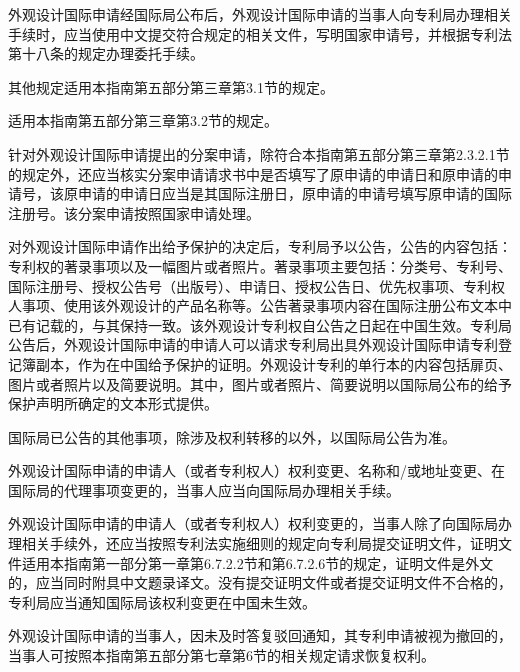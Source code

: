 外观设计国际申请经国际局公布后，外观设计国际申请的当事人向专利局办理相关手续时，应当使用中文提交符合规定的相关文件，写明国家申请号，并根据专利法第十八条的规定办理委托手续。

其他规定适用本指南第五部分第三章第3.1节的规定。

适用本指南第五部分第三章第3.2节的规定。

针对外观设计国际申请提出的分案申请，除符合本指南第五部分第三章第2.3.2.1节的规定外，还应当核实分案申请请求书中是否填写了原申请的申请日和原申请的申请号，该原申请的申请日应当是其国际注册日，原申请的申请号填写原申请的国际注册号。该分案申请按照国家申请处理。

对外观设计国际申请作出给予保护的决定后，专利局予以公告，公告的内容包括：专利权的著录事项以及一幅图片或者照片。著录事项主要包括：分类号、专利号、国际注册号、授权公告号（出版号）、申请日、授权公告日、优先权事项、专利权人事项、使用该外观设计的产品名称等。公告著录事项内容在国际注册公布文本中已有记载的，与其保持一致。该外观设计专利权自公告之日起在中国生效。专利局公告后，外观设计国际申请的申请人可以请求专利局出具外观设计国际申请专利登记簿副本，作为在中国给予保护的证明。外观设计专利的单行本的内容包括扉页、图片或者照片以及简要说明。其中，图片或者照片、简要说明以国际局公布的给予保护声明所确定的文本形式提供。

国际局已公告的其他事项，除涉及权利转移的以外，以国际局公告为准。

外观设计国际申请的申请人（或者专利权人）权利变更、名称和/或地址变更、在国际局的代理事项变更的，当事人应当向国际局办理相关手续。

外观设计国际申请的申请人（或者专利权人）权利变更的，当事人除了向国际局办理相关手续外，还应当按照专利法实施细则的规定向专利局提交证明文件，证明文件适用本指南第一部分第一章第6.7.2.2节和第6.7.2.6节的规定，证明文件是外文的，应当同时附具中文题录译文。没有提交证明文件或者提交证明文件不合格的，专利局应当通知国际局该权利变更在中国未生效。

外观设计国际申请的当事人，因未及时答复驳回通知，其专利申请被视为撤回的，当事人可按照本指南第五部分第七章第6节的相关规定请求恢复权利。

